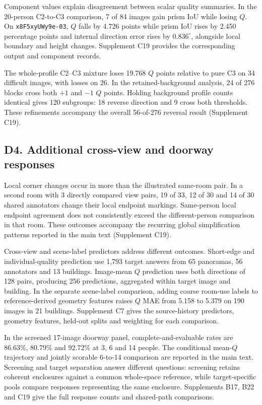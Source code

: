Component values explain disagreement between scalar quality summaries. In the 20-person C2-to-C3 comparison, 7 of 84 images gain prism IoU while losing $Q$. On \texttt{x8F5xyUWy9e-03}, $Q$ falls by 4.726 points while prism IoU rises by 2.450 percentage points and internal direction error rises by $0.836^\circ$, alongside local boundary and height changes. Supplement C19 provides the corresponding output and component records.

The whole-profile C2--C3 mixture loses 19.768 $Q$ points relative to pure C3 on 34 difficult images, with losses on 26. In the retained-background analysis, 24 of 276 blocks cross both $+1$ and $-1$ $Q$ points. Holding background profile counts identical gives 120 subgroups: 18 reverse direction and 9 cross both thresholds. These refinements accompany the overall 56-of-276 reversal result (Supplement C19).

\subsection*{D4. Additional cross-view and doorway responses}
\label{supp:d4-viewpoint}

Local corner changes occur in more than the illustrated same-room pair. In a second room with 3 directly compared view pairs, 19 of 33, 12 of 30 and 14 of 30 shared annotators change their local endpoint markings. Same-person local endpoint agreement does not consistently exceed the different-person comparison in that room. These outcomes accompany the recurring global simplification patterns reported in the main text (Supplement C19).

Cross-view and scene-label predictors address different outcomes. Short-edge and individual-quality prediction use 1,793 target answers from 65 panoramas, 56 annotators and 13 buildings. Image-mean $Q$ prediction uses both directions of 128 pairs, producing 256 predictions, aggregated within target image and building. In the separate scene-label comparison, adding coarse room-use labels to reference-derived geometry features raises $Q$ MAE from 5.158 to 5.379 on 190 images in 21 buildings. Supplement C7 gives the source-history predictors, geometry features, held-out splits and weighting for each comparison.

In the screened 17-image doorway panel, complete-and-evaluable rates are 86.63\%, 80.79\% and 92.72\% at 3, 6 and 14 people. The conditional mean-$Q$ trajectory and jointly scorable 6-to-14 comparison are reported in the main text. Screening and target separation answer different questions: screening retains coherent enclosures against a common whole-space reference, while target-specific pools compare responses representing the same enclosure. Supplements B17, B22 and C19 give the full response counts and shared-path comparisons.

